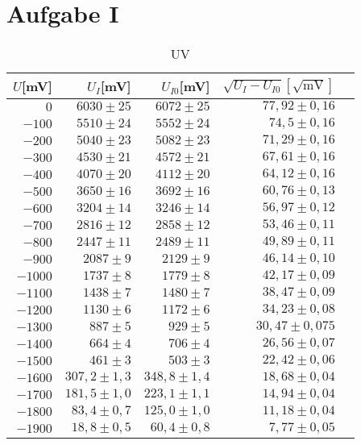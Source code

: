 \section{Aufgabe I}

\begin{table}[h!]
    \centering
    \caption{UV}
    \begin{tabular}{r r r r r}
    \toprule
    $U$[mV] & $U_I$[mV] & $U_{I0}$[mV] & $\sqrt{U_I  - U_{I0}}[\sqrt{\text{mV}}]$\\
    \midrule
    $0$     &   $6030 \pm 25$   & $6072 \pm 25$& $77,92 \pm 0,16$ \\
    $-100$  &   $5510 \pm 24$   & $5552 \pm 24$& $74,5 \pm 0,16$\\
    $-200$  &   $5040 \pm 23$   & $5082 \pm 23$& $71,29 \pm 0,16$\\
    $-300$  &   $4530 \pm 21$   & $4572 \pm 21$& $67,61 \pm 0,16$\\
    $-400$  &   $4070 \pm 20$   & $4112 \pm 20$& $64,12\pm 0,16$ \\
    $-500$  &  $ 3650 \pm 16$   & $3692 \pm 16$& $60,76 \pm 0,13$ \\
    $-600$  &   $3204 \pm 14$   & $3246 \pm 14$& $56,97 \pm 0,12$ \\
    $-700$  &   $2816 \pm 12$   & $2858 \pm 12$& $53,46 \pm 0,11$ \\
    $-800$  &   $2447 \pm 11$   & $2489 \pm 11$& $49,89 \pm 0,11$\\
    $-900$  &   $2087  \pm 9$   & $2129 \pm 9$& $46,14 \pm 0,10$\\
    $-1000$  &   $1737 \pm 8$   & $1779 \pm 8$& $42,17 \pm 0,09$\\
    $-1100$ & $1438 \pm 7$      & $1480\pm 7$& $38,47 \pm 0,09$\\
    $-1200$  &  $1130 \pm 6$    & $1172 \pm 6$& $34,23 \pm 0,08$\\
    $-1300$  &  $887 \pm 5$     & $929 \pm 5$&$ 30,47 \pm 0,075$\\
    $-1400$  & $664 \pm4$       & $706 \pm 4$& $26,56 \pm 0,07$\\
    $-1500$  & $461 \pm 3$      & $503 \pm 3$& $22,42 \pm 0,06$\\
    $-1600$  & $307,2 \pm 1,3$  & $348,8 \pm 1,4$& $18,68 \pm 0,04$\\
    $-1700$  &  $181,5 \pm 1,0$ & $223,1 \pm 1,1$& $14,94 \pm 0,04$\\
    $-1800$  & $83,4 \pm 0,7$   & $125,0 \pm 1,0$& $ 11,18 \pm 0,04$\\
    $-1900$  &  $18,8 \pm 0,5$  & $60,4 \pm 0,8$& $7,77 \pm 0,05$\\

    \end{tabular}
\end{table}

